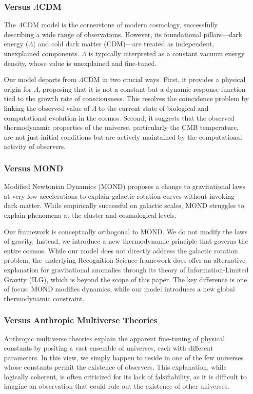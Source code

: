 \documentclass[11pt,a4paper]{article}
\theoremstyle{definition}
\theoremstyle{remark}
\begin{document}
\subsubsection{Versus \(\Lambda\)CDM}
The \(\Lambda\)CDM model is the cornerstone of modern cosmology, successfully describing a wide range of observations. However, its foundational pillars—dark energy (\(\Lambda\)) and cold dark matter (CDM)—are treated as independent, unexplained components. \(\Lambda\) is typically interpreted as a constant vacuum energy density, whose value is unexplained and fine-tuned.

Our model departs from \(\Lambda\)CDM in two crucial ways. First, it provides a physical origin for \(\Lambda\), proposing that it is not a constant but a dynamic response function tied to the growth rate of consciousness. This resolves the coincidence problem by linking the observed value of \(\Lambda\) to the current state of biological and computational evolution in the cosmos. Second, it suggests that the observed thermodynamic properties of the universe, particularly the CMB temperature, are not just initial conditions but are actively maintained by the computational activity of observers.

\subsubsection{Versus MOND}
Modified Newtonian Dynamics (MOND) proposes a change to gravitational laws at very low accelerations to explain galactic rotation curves without invoking dark matter. While empirically successful on galactic scales, MOND struggles to explain phenomena at the cluster and cosmological levels.

Our framework is conceptually orthogonal to MOND. We do not modify the laws of gravity. Instead, we introduce a new thermodynamic principle that governs the entire cosmos. While our model does not directly address the galactic rotation problem, the underlying Recognition Science framework does offer an alternative explanation for gravitational anomalies through its theory of Information-Limited Gravity (ILG), which is beyond the scope of this paper. The key difference is one of focus: MOND modifies dynamics, while our model introduces a new global thermodynamic constraint.

\subsubsection{Versus Anthropic Multiverse Theories}
Anthropic multiverse theories explain the apparent fine-tuning of physical constants by positing a vast ensemble of universes, each with different parameters. In this view, we simply happen to reside in one of the few universes whose constants permit the existence of observers. This explanation, while logically coherent, is often criticized for its lack of falsifiability, as it is difficult to imagine an observation that could rule out the existence of other universes.
\end{document}
